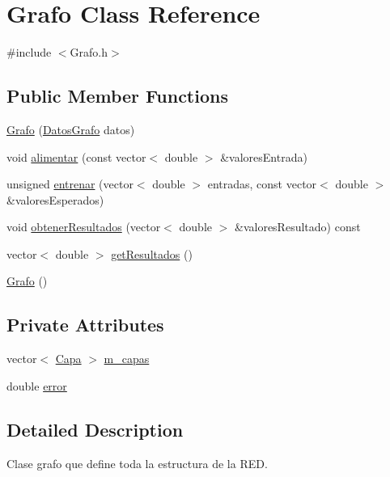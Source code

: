 \hypertarget{classGrafo}{\section{Grafo Class Reference}
\label{classGrafo}
}


{\ttfamily \#include $<$Grafo.\-h$>$}

\subsection*{Public Member Functions}
\begin{DoxyCompactItemize}
\item 
\hyperlink{classGrafo_a1876ac5c509e53a40eccbeaeaa65666e}{Grafo} (\hyperlink{classDatosGrafo}{Datos\-Grafo} datos)
\item 
void \hyperlink{classGrafo_af35326ac9f80c6ca763a1c3b0ef15b60}{alimentar} (const vector$<$ double $>$ \&valores\-Entrada)
\item 
unsigned \hyperlink{classGrafo_af2bc519db98b68230c525db3331c1c66}{entrenar} (vector$<$ double $>$ entradas, const vector$<$ double $>$ \&valores\-Esperados)
\item 
void \hyperlink{classGrafo_a158dbc3b6695be5e34f5e82ad7670632}{obtener\-Resultados} (vector$<$ double $>$ \&valores\-Resultado) const 
\item 
vector$<$ double $>$ \hyperlink{classGrafo_a985b9195224b1d3d9132d55c5db08cb9}{get\-Resultados} ()
\item 
\hyperlink{classGrafo_ab810bbe26a98e9af6661ccddff66b03b}{Grafo} ()
\end{DoxyCompactItemize}
\subsection*{Private Attributes}
\begin{DoxyCompactItemize}
\item 
vector$<$ \hyperlink{Capa_8h_af7763c80258043d4df4839c4942d819b}{Capa} $>$ \hyperlink{classGrafo_a3bfeff1ebed4dc888fb228ccbe5ac80a}{m\-\_\-capas}
\item 
double \hyperlink{classGrafo_a3193bdd51068bca3fafe8ba51631e32e}{error}
\end{DoxyCompactItemize}


\subsection{Detailed Description}
Clase grafo que define toda la estructura de la R\-E\-D. 

